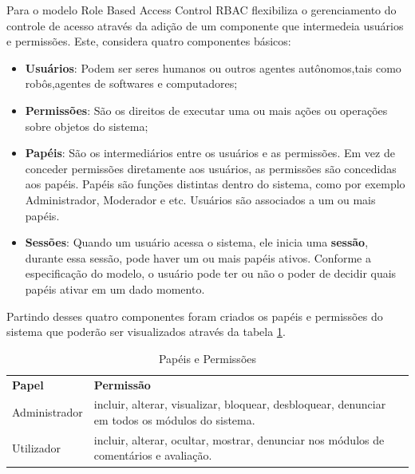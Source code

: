 \documentclass[12pt, a4paper]{report}
\begin{document}
Para \citep{sandhu1997} o modelo Role Based Access Control \ac{RBAC} flexibiliza o gerenciamento do controle de acesso através da adição de um componente que intermedeia usuários e permissões. Este, considera quatro componentes básicos:
\begin{itemize}
\item \textbf{Usuários}: Podem ser seres humanos ou outros agentes autônomos,tais como robôs,agentes de softwares e computadores;
\item \textbf{Permissões}: São os direitos de executar uma ou mais ações ou operações sobre objetos do sistema;
\item \textbf{Papéis}: São os intermediários entre os usuários e as permissões. Em vez de conceder permissões diretamente aos usuários, as permissões são concedidas aos papéis. Papéis são funções distintas dentro do sistema, como por exemplo Administrador, Moderador e etc. Usuários são associados a um ou mais papéis.  
\item \textbf{Sessões}: Quando um usuário acessa o sistema, ele inicia uma \textbf{sessão}, durante  essa  sessão, pode haver  um  ou  mais  papéis ativos. Conforme a especificação do modelo, o usuário pode ter ou não o poder de decidir quais papéis ativar em um dado momento.
\end{itemize}

Partindo desses quatro componentes foram criados os papéis e permissões do sistema que poderão ser visualizados através da tabela \ref{tab:papelperm}.

\begin{table}
 \centering
 {\renewcommand\arraystretch{1.25}
 \begin{tabular}{ l l }
  \cline{1-1}\cline{2-2}  
    \multicolumn{1}{|p{3.850cm}|}{\textbf{Papel} \centering } &
    \multicolumn{1}{p{4.217cm}|}{\textbf{Permissão} \centering }
  \\  
  \cline{1-1}\cline{2-2}  
    \multicolumn{1}{|p{3.850cm}|}{Administrador} &
    \multicolumn{1}{p{4.217cm}|}{incluir, alterar, visualizar, bloquear, desbloquear, denunciar em todos os módulos do sistema.}
  \\  
  \cline{1-1}\cline{2-2}  
    \multicolumn{1}{|p{3.850cm}|}{Utilizador} &
    \multicolumn{1}{p{4.217cm}|}{incluir, alterar, ocultar, mostrar, denunciar nos módulos de comentários e avaliação.}
  \\  
  \hline
 \end{tabular} }
 \caption{Papéis e Permissões}
  \label{tab:papelperm}
\end{table}
\end{document}

